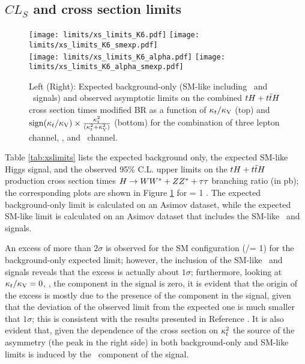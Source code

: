\subsection{$CL_S$ and cross section limits}

\begin{figure} [!h]
 \centering
 \texttt{[image: limits/xs\_limits\_K6.pdf]}
 \texttt{[image: limits/xs\_limits\_K6\_smexp.pdf]} \\  
 \texttt{[image: limits/xs\_limits\_K6\_alpha.pdf]}
 \texttt{[image: limits/xs\_limits\_K6\_alpha\_smexp.pdf]} 
\caption[Asymptotic limits on the combined $\tH+\ttH$ $\sigma\times$BR]{Left (Right): Expected background-only (SM-like including  \ttH\ and \tH\ signals) and observed asymptotic limits on the combined $\tH+\ttH$ cross section times modified BR as a function of $\kappa_t/\kappa_\text{V}$ (top) and $\mathrm{sign}(\kappa_t/\kappa_\text{V})\times\frac{\kappa_t^2}{(\kappa_t^2+\kappa_\text{V}^2)}$ (bottom) for the combination of three lepton channel, \mumu, and \emu\ channel. }
\label{fig:xs_limits}
\end{figure}

Table \ref{tab:xslimits} lists the expected background only, the expected SM-like Higgs signal, and the observed 95\% C.L. upper limits on the $\tH+\ttH$ production cross section times $H \to WW^*+ZZ^*+\tau\tau$ branching ratio (in pb); the corresponding plots are shown in Figure \ref{fig:xs_limits} for \CV= 1 . The expected background-only limit is calculated on an Asimov dataset, while the expected SM-like limit is calculated on an Asimov dataset that includes the SM-like \tH\ and \ttH signals.

An excess of more than $2\sigma$ is observed for the SM configuration (\Ct/\CV= 1) for the background-only expected limit; however, the inclusion of the SM-like \tH\ and \ttH signals reveals that the excess is actually about $1\sigma$; furthermore, looking at $\kappa_t/\kappa_\text{V}=0$, \ie, the \ttH component in the signal is zero, it is evident that the origin of the excess is mostly due to the presence of the \ttH component in the signal, given that the deviation of the observed limit from the expected one is much smaller that $1\sigma$; this is consistent with the results presented in Reference \cite{CMS_AN_2017-029}. It is also evident that, given the dependence of the \ttH cross section on $\kappa_t^2$ the source of the asymmetry (the peak in the right side) in both background-only and SM-like limits is induced by the \tH\ component of the signal.     

